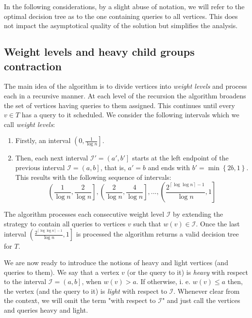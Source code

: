 \documentclass[a4paper, anonymous, numberwithinsect, pdfa, UKenglish,cleveref, autoref, thm-restate]{socg-lipics-v2021}
\newcommand{\br}[1]{\left( #1 \right)}
\newcommand{\brc}[1]{\left\{ #1 \right\}}
\newcommand{\cl}[1]{\left\lceil #1 \right\rceil}
\begin{document}
In the following considerations, by a slight abuse of notation, we will refer to the optimal decision tree as to the one containing queries to all vertices. This does not impact the asymptotical quality of the solution but simplifies the analysis.

\subsection{Weight levels and heavy child groups contraction}\label{wLvlsAndGrpContraction}

The main idea of the algorithm is to divide vertices into \textit{weight levels} and process each in a recursive manner. At each level of the recursion the algorithm broadens the set of vertices having queries to them assigned. This continues until every $v\in T$ has a query to it scheduled. We consider the following intervals which we call \textit{weight levels}:
\begin{enumerate}
    \item Firstly, an interval $\left( 0,\frac{1}{\log n}\right]$.
    \item Then, each next interval $\mathcal{I}'=\left(a',b'\right]$ starts at the left endpoint of the previous interval $\mathcal{I}=\left(a,b\right]$, that is, $a'=b$ and ends with $b'=\min\brc{2b, 1}$. This results with the following sequence of intervals:
    $$\left(\frac{1}{\log n},\frac{2}{\log n}\right], \left(\frac{2}{\log n},\frac{4}{\log n}\right],..., \left(\frac{2^{\cl{\log\log n}-1}}{\log n},1\right]$$
\end{enumerate} 
The algorithm processes each consecutive weight level $\mathcal{I}$ by extending the strategy to contain all queries to vertices $v$ such that $w\br{v}\in \mathcal{I}$.
Once the last interval $\left(\frac{2^{\cl{\log\log n}-1}}{\log n},1\right]$ is processed the algorithm returns a valid decision tree for $T$. 

We are now ready to introduce the notions of heavy and light vertices (and queries to them). We say that a vertex $v$ (or the query to it) is \textit{heavy} with respect to the interval $\mathcal{I}=\left(a,b\right]$, when $w\br{v}>a$. If otherwise, i. e. $w\br{v}\leq a$ then, the vertex (and the query to it) is \textit{light} with respect to $\mathcal{I}$. Whenever clear from the context, we will omit the term "with respect to $\mathcal{I}$" and just call the vertices and queries heavy and light.
\end{document}
